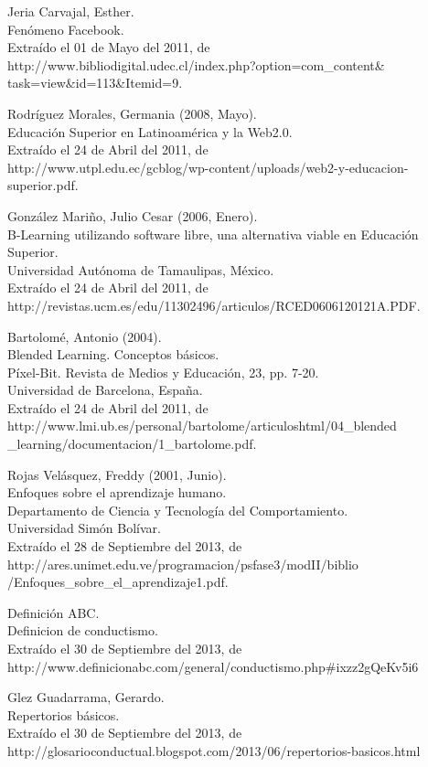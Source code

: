\begin{thebibliography}{99}

 Jeria Carvajal, Esther.\\
Fenómeno Facebook.\\
Extraído el 01 de Mayo del 2011, de\\
http://www.bibliodigital.udec.cl/index.php?option=com\_content\& task=view\&id=113\&Itemid=9.

 Rodríguez Morales, Germania (2008, Mayo).\\
Educación Superior en Latinoamérica y la Web2.0.\\
Extraído el 24 de Abril del 2011, de\\
http://www.utpl.edu.ec/gcblog/wp-content/uploads/web2-y-educacion-superior.pdf.

 González Mariño, Julio Cesar (2006, Enero).\\
B-Learning utilizando software libre, una alternativa viable en Educación
Superior.\\
Universidad Autónoma de Tamaulipas, México.\\
Extraído el 24 de Abril del 2011, de\\
http://revistas.ucm.es/edu/11302496/articulos/RCED0606120121A.PDF.

 Bartolomé, Antonio (2004).\\
Blended Learning. Conceptos básicos.\\
Píxel-Bit. Revista de Medios y Educación, 23, pp. 7-20.\\
Universidad de Barcelona, España.\\
Extraído el 24 de Abril del 2011, de\\
http://www.lmi.ub.es/personal/bartolome/articuloshtml/04\_blended
\_learning/documentacion/1\_bartolome.pdf.

 Rojas Velásquez, Freddy (2001, Junio).\\
Enfoques sobre el aprendizaje humano.\\
Departamento de Ciencia y Tecnología del Comportamiento.\\
Universidad Simón Bolívar.\\
Extraído el 28 de Septiembre del 2013, de\\
http://ares.unimet.edu.ve/programacion/psfase3/modII/biblio
/Enfoques\_sobre\_el\_aprendizaje1.pdf.

 Definición ABC.\\
Definicion de conductismo.\\
Extraído el 30 de Septiembre del 2013, de\\
http://www.definicionabc.com/general/conductismo.php\#ixzz2gQeKv5i6

 Glez Guadarrama, Gerardo.\\
Repertorios básicos.\\
Extraído el 30 de Septiembre del 2013, de\\
http://glosarioconductual.blogspot.com/2013/06/repertorios-basicos.html

\end{thebibliography}
